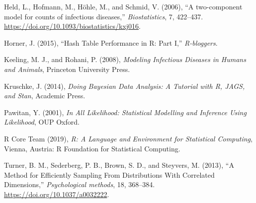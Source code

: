 \documentclass[11pt,a4paper]{article}
\numberwithin{equation}{section}
\begin{document}
\leavevmode\hypertarget{ref-held_two-component_2006}{}%
Held, L., Hofmann, M., Höhle, M., and Schmid, V. (2006), ``A
two-component model for counts of infectious diseases,''
\emph{Biostatistics}, 7, 422--437.
\url{https://doi.org/10.1093/biostatistics/kxj016}.

\leavevmode\hypertarget{ref-horner_hash_2015}{}%
Horner, J. (2015), ``Hash Table Performance in R: Part I,''
\emph{R-bloggers}.

\leavevmode\hypertarget{ref-keeling_modeling_2008}{}%
Keeling, M. J., and Rohani, P. (2008), \emph{Modeling Infectious
Diseases in Humans and Animals}, Princeton University Press.

\leavevmode\hypertarget{ref-kruschke_doing_2014}{}%
Kruschke, J. (2014), \emph{Doing Bayesian Data Analysis: A Tutorial with
R, JAGS, and Stan}, Academic Press.

\leavevmode\hypertarget{ref-pawitan_all_2001}{}%
Pawitan, Y. (2001), \emph{In All Likelihood: Statistical Modelling and
Inference Using Likelihood}, OUP Oxford.

\leavevmode\hypertarget{ref-r_core_team_r_2019}{}%
R Core Team (2019), \emph{R: A Language and Environment for Statistical
Computing}, Vienna, Austria: R Foundation for Statistical Computing.

\leavevmode\hypertarget{ref-turner_method_2013}{}%
Turner, B. M., Sederberg, P. B., Brown, S. D., and Steyvers, M. (2013),
``A Method for Efficiently Sampling From Distributions With Correlated
Dimensions,'' \emph{Psychological methods}, 18, 368--384.
\url{https://doi.org/10.1037/a0032222}.
\end{document}

